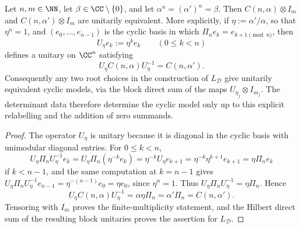 \begin{lemma}\label{lem:choice-of-roots}
  Let \(n,m\in\NN\), let \(\beta\in\CC\setminus\{0\}\), and let
  \(\alpha^n=(\alpha')^n=\beta\). Then
  \(C(n,\alpha)\otimes I_m\) and \(C(n,\alpha')\otimes I_m\) are
  unitarily equivalent. More explicitly, if
  \(\eta:=\alpha'/\alpha\), so that \(\eta^n=1\), and
  \((e_0,\dots,e_{n-1})\) is the cyclic basis in which
  \(\Pi_n e_k=e_{k+1\!\!\pmod n}\), then
  \[
    U_\eta e_k:=\eta^k e_k
    \qquad (0\le k<n)
  \]
  defines a unitary on \(\CC^n\) satisfying
  \[
    U_\eta C(n,\alpha)U_\eta^{-1}=C(n,\alpha').
  \]
  Consequently any two root choices in the construction of
  \(L_{\mathcal D}\) give unitarily equivalent cyclic models, via the
  block direct sum of the maps \(U_{\eta_j}\otimes I_{m_j}\). The
  determinant data therefore determine the cyclic model only up to this
  explicit relabelling and the addition of zero summands.
\end{lemma}

\begin{proof}
  The operator \(U_\eta\) is unitary because it is diagonal in the cyclic
  basis with unimodular diagonal entries. For \(0\le k<n\),
  \[
    U_\eta\Pi_nU_\eta^{-1}e_k
    =U_\eta\Pi_n(\eta^{-k} e_k)
    =\eta^{-k}U_\eta e_{k+1}
    =\eta^{-k}\eta^{k+1}e_{k+1}
    =\eta\Pi_ne_k
  \]
  if \(k<n-1\), and the same computation at \(k=n-1\) gives
  \(U_\eta\Pi_nU_\eta^{-1}e_{n-1}=\eta^{-(n-1)}e_0=\eta e_0\), since
  \(\eta^n=1\). Thus \(U_\eta\Pi_nU_\eta^{-1}=\eta\Pi_n\). Hence
  \[
    U_\eta C(n,\alpha)U_\eta^{-1}
    =\alpha\eta\Pi_n
    =\alpha'\Pi_n
    =C(n,\alpha').
  \]
  Tensoring with \(I_m\) proves the finite-multiplicity statement, and the
  Hilbert direct sum of the resulting block unitaries proves the assertion
  for \(L_{\mathcal D}\).
\end{proof}

